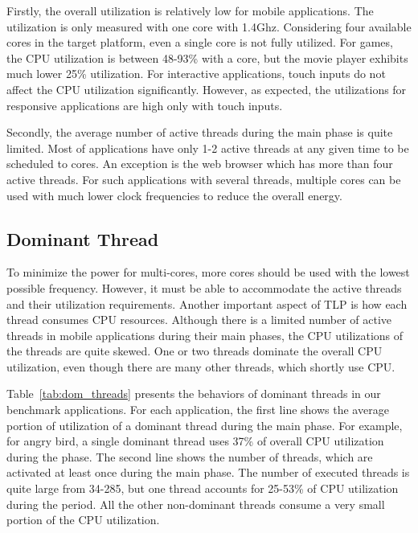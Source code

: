 Firstly, the overall utilization is relatively low for mobile applications. The utilization is
only measured with one core with 1.4Ghz. Considering four available cores in the target platform,
even a single core is not fully utilized. For games, the CPU utilization is between 48-93\%
with a core, but the movie player exhibits much lower 25\% utilization. For interactive
applications, touch inputs do not affect the CPU utilization significantly. However, as expected,
the utilizations for responsive applications are high only with touch inputs. 

Secondly, the average number of active threads during the main phase is quite limited. Most
of applications have only 1-2 active threads at any given time to be scheduled to cores. 
An exception is the web browser which has more than four active threads. For such applications
with several threads, multiple cores can be used with much lower clock frequencies to reduce
the overall energy.

\subsection{Dominant Thread}



To minimize the power for multi-cores, more cores should be used with the lowest possible frequency.
However, it must be able to accommodate the active threads and their utilization requirements. 
Another important aspect of TLP is how each thread consumes CPU resources. Although there is 
a limited number of active threads in mobile applications during their main phases, the CPU utilizations
of the threads are quite skewed. One or two threads dominate the overall CPU utilization, even though
there are many other threads, which shortly use CPU.

Table~\ref{tab:dom_threads} presents the behaviors of dominant threads in our benchmark applications.
For each application, the first line shows the average portion of utilization of a dominant thread during
the main phase. For example, for angry bird, a single dominant thread uses 37\% of overall CPU utilization 
during the phase. The second line shows the number of threads, which are activated at least once 
during the main phase. The number of
executed threads is quite large from 34-285, but one thread accounts for 25-53\% of CPU utilization during
the period. All the other non-dominant threads consume a very small portion of the CPU utilization.

